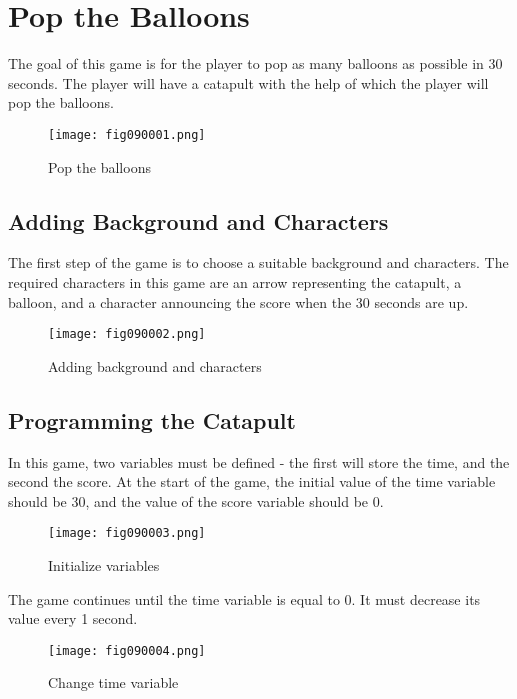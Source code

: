 \chapter{Pop the Balloons}

The goal of this game is for the player to pop as many balloons as possible in 30 seconds. The player will have a catapult with the help of which the player will pop the balloons.

\begin{figure}[H]
   \centering
   \texttt{[image: fig090001.png]}
   \caption{Pop the balloons}
\label{fig090001}
\end{figure}

\section{Adding Background and Characters}
The first step of the game is to choose a suitable background and characters. The required characters in this game are an arrow representing the catapult, a balloon, and a character announcing the score when the 30 seconds are up.

\begin{figure}[H]
   \centering
   \texttt{[image: fig090002.png]}
   \caption{Adding background and characters}
\label{fig090002}
\end{figure}

\section{Programming the Catapult}
In this game, two variables must be defined - the first will store the time, and the second the score. At the start of the game, the initial value of the time variable should be 30, and the value of the score variable should be 0.

\begin{figure}[H]
   \centering
   \texttt{[image: fig090003.png]}
   \caption{Initialize variables}
\label{fig090003}
\end{figure}

The game continues until the time variable is equal to 0. It must decrease its value every 1 second.

\begin{figure}[H]
   \centering
   \texttt{[image: fig090004.png]}
   \caption{Change time variable}
\label{fig090004}
\end{figure}


